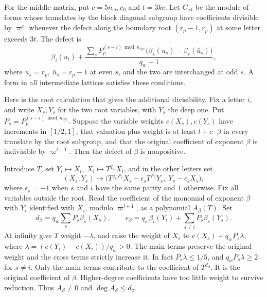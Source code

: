 For the middle matrix, put \(c=5n_\mathrm{cyc}c_0\) and \(t=3kc\).
Let \(C_\mathrm{ed}\) be the module of forms whose translates by the
block diagonal subgroup have coefficients divisible by \(\varpi^c\)
whenever the defect along the boundary root \((r_p-1,r_p)\)
at some letter exceeds \(3t\).
The defect is
\[
 \beta_i(u_i)+\frac{\displaystyle\sum_s
   P_p^{(s-i)\bmod n_\mathrm{cyc}}\bigl(\beta_s(u_s)-\beta_s(\bar u_s)\bigr)}
                      {q_w-1},
\]
where \(u_s=r_p,\ \bar u_s=r_p-1\) at even \(s\), and the two are
interchanged at odd \(s\).
A form in all intermediate lattices satisfies these conditions.

Here is the root calculation that gives the additional divisibility.
Fix a letter \(i\), and write \(X_s,Y_s\) for the two root variables,
with \(Y_s\) the deep one. Put \(P_s=P_p^{(s-i)\bmod n_\mathrm{cyc}}\).
Suppose the variable weights \(c(X_s),c(Y_s)\) have increments in
\([1/2,1]\), that valuation plus weight is at least \(l+c\cdot\beta\)
in every translate by the root subgroup, and that the original
coefficient of exponent \(\beta\) is indivisible by \(\varpi^{l+1}\).
Then the defect of \(\beta\) is nonpositive.

Introduce \(T\), set \(Y_i\mapsto X_i,\ X_i\mapsto T^{q_w}X_i\),
and in the other letters set
\[
 (X_s,Y_s)\longmapsto
 \bigl(T^{q_wP_s}X_s-\epsilon_s T^{P_s}Y_s,\;
                  Y_s-\epsilon_s X_s\bigr),
\]
where \(\epsilon_s=-1\) when \(s\) and \(i\) have the same parity
and \(1\) otherwise. Fix all variables outside the root.
Read the coefficient of the monomial of exponent \(\beta\) with
\(Y_i\) identified with \(X_i\), modulo \(\varpi^{l+1}\), as a
polynomial \(A_\beta(T)\). Set
\[
 d_\beta=q_w\sum_sP_s\beta_s(X_s),\qquad
 e_\beta=q_w\beta_i(Y_i)+\sum_{s\ne i}P_s\beta_s(Y_s).
\]
At infinity give \(T\) weight \(-\lambda\), and raise the weight of
\(X_s\) to \(c(X_s)+q_wP_s\lambda\), where
\(\lambda=(c(Y_i)-c(X_i))/q_w>0\).
The main terms preserve the original weight and the cross terms
strictly increase it. In fact \(P_s\lambda\le1/5\), and
\(q_wP_s\lambda\ge2\) for \(s\ne i\).
Only the main terms contribute to the coefficient of \(T^{d_\beta}\).
It is the original coefficient of \(\beta\).
Higher-degree coefficients have too little weight to survive
reduction. Thus \(A_\beta\ne0\) and \(\deg A_\beta\le d_\beta\).

